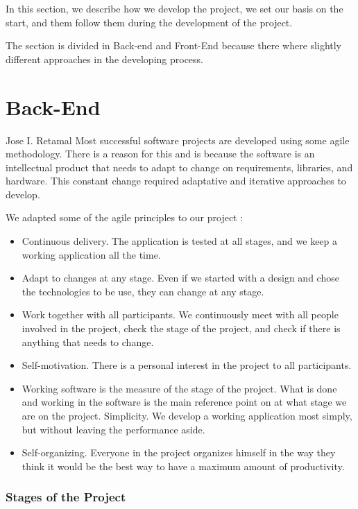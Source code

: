 \indent
\indent
In this section, we describe how we develop the project, we set our basis on the start, and them follow them during the development of the project. 

The section is divided in Back-end and Front-End because there where slightly different approaches in the developing process.
\section{Back-End}
Jose I. Retamal
\vskip 0.1in
\indent
\indent
Most successful software projects are developed using some agile methodology\cite{agilemanifesto}. There is a reason for this and is because the software is an intellectual product that needs to adapt to change on requirements, libraries, and hardware. This constant change required adaptative and iterative approaches to develop.

We adapted some of the agile principles to our project \cite{agilemanifesto}:
\begin{itemize}
	\item Continuous delivery. The application is tested at all stages, and we keep a working application all the time.
	\item Adapt to changes at any stage. Even if we started with a design and chose the technologies to be use, they can change at any stage. 
   	\item 	Work together with all participants. We continuously meet with all people involved in the project, check the stage of the project, and check if there is anything that needs to change.
	\item	Self-motivation. There is a personal interest in the project to all participants.
	\item	Working software is the measure of the stage of the project. What is done and working in the software is the main reference point on at what stage we are on the project.
	Simplicity. We develop a working application most simply, but without leaving the performance aside.
	\item	Self-organizing. Everyone in the project organizes himself in the way they think it would be the best way to have a maximum amount of productivity. 
\end{itemize}



\subsubsection{Stages of the Project}

